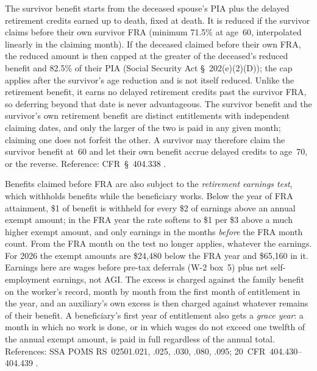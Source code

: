 \documentclass[fleqn,12pt]{report}
\begin{document}
The survivor benefit starts from the deceased spouse's PIA plus the delayed
retirement credits earned up to death, fixed at death.  It is reduced if the
survivor claims before their own survivor FRA (minimum 71.5\% at age~60,
interpolated linearly in the claiming month).  If the deceased claimed before
their own FRA, the reduced amount is then capped at the greater of the deceased's
reduced benefit and 82.5\% of their PIA (Social Security Act §~202(e)(2)(D)); the
cap applies after the survivor's age reduction and is not itself reduced.
Unlike the retirement benefit, it earns no delayed retirement credits past the
survivor FRA, so deferring beyond that date is never advantageous.
The survivor benefit and the survivor's own retirement benefit are distinct
entitlements with independent claiming dates, and only the larger of the two is
paid in any given month; claiming one does not forfeit the other. A survivor may
therefore claim the survivor benefit at~60 and let their own benefit accrue
delayed credits to age~70, or the reverse.
Reference: CFR~§~404.338 \cite{ssa-poms}.

Benefits claimed before FRA are also subject to the \emph{retirement earnings
test}, which withholds benefits while the beneficiary works.
Below the year of FRA attainment, \$1 of benefit is withheld for every \$2 of
earnings above an annual exempt amount; in the FRA year the rate softens to \$1
per \$3 above a much higher exempt amount, and only earnings in the months
\emph{before} the FRA month count.
From the FRA month on the test no longer applies, whatever the earnings.
For 2026 the exempt amounts are \$24,480 below the FRA year and \$65,160 in it.
Earnings here are wages before pre-tax deferrals (W-2 box~5) plus net
self-employment earnings, not AGI.
The excess is charged against the family benefit on the worker's record,
month by month from the first month of entitlement in the year, and an
auxiliary's own excess is then charged against whatever remains of their
benefit.
A beneficiary's first year of entitlement also gets a \emph{grace year}: a
month in which no work is done, or in which wages do not exceed one twelfth of
the annual exempt amount, is paid in full regardless of the annual total.
References: SSA POMS RS~02501.021, .025, .030, .080, .095;
20~CFR~404.430--404.439 \cite{cfr404earnings}.
\end{document}
